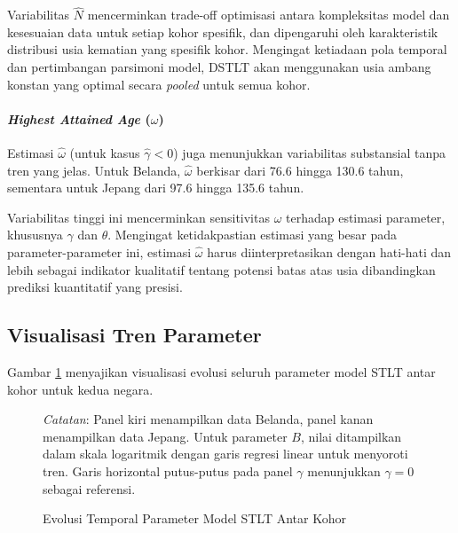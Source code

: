 Variabilitas $\hat{N}$ mencerminkan trade-off optimisasi antara kompleksitas model dan kesesuaian data untuk setiap kohor spesifik, dan dipengaruhi oleh karakteristik distribusi usia kematian yang spesifik kohor. Mengingat ketiadaan pola temporal dan pertimbangan parsimoni model, DSTLT akan menggunakan usia ambang konstan yang optimal secara \textit{pooled} untuk semua kohor.

\paragraph{\textit{Highest Attained Age} ($\omega$)}
Estimasi $\hat{\omega}$ (untuk kasus $\hat{\gamma} < 0$) juga menunjukkan variabilitas substansial tanpa tren yang jelas. Untuk Belanda, $\hat{\omega}$ berkisar dari 76.6 hingga 130.6 tahun, sementara untuk Jepang dari 97.6 hingga 135.6 tahun.

Variabilitas tinggi ini mencerminkan sensitivitas $\omega$ terhadap estimasi parameter, khususnya $\gamma$ dan $\theta$. Mengingat ketidakpastian estimasi yang besar pada parameter-parameter ini, estimasi $\hat{\omega}$ harus diinterpretasikan dengan hati-hati dan lebih sebagai indikator kualitatif tentang potensi batas atas usia dibandingkan prediksi kuantitatif yang presisi.

\subsection{Visualisasi Tren Parameter}

Gambar \ref{fig:parameter_evolution} menyajikan visualisasi evolusi seluruh parameter model STLT antar kohor untuk kedua negara.

\begin{figure}[htbp]
\centering
\caption{Evolusi Temporal Parameter Model STLT Antar Kohor}
\label{fig:parameter_evolution}
\begin{fignotes}
\small
\item \textit{Catatan}: Panel kiri menampilkan data Belanda, panel kanan menampilkan data Jepang. Untuk parameter $B$, nilai ditampilkan dalam skala logaritmik dengan garis regresi linear untuk menyoroti tren. Garis horizontal putus-putus pada panel $\gamma$ menunjukkan $\gamma = 0$ sebagai referensi.
\end{fignotes}
\end{figure}

